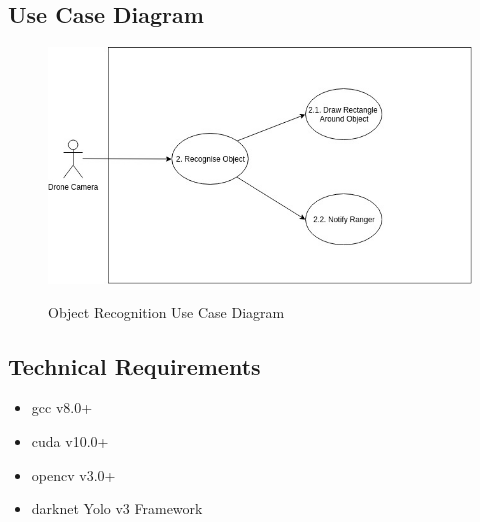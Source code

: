 \subsection{Use Case Diagram}
\begin{flushleft}
	\begin{figure}[h!]
		\centering
		\includegraphics[scale=0.5]{./assets/images/object-recognition-ucd.jpg}
		\label{fig: object-recognition-ucd }
		\caption{Object Recognition Use Case Diagram}
	\end{figure}

\end{flushleft}

\subsection{Technical Requirements}
	\begin{flushleft}
		\begin{itemize}
				\item gcc v8.0+
				\item cuda v10.0+
				\item opencv v3.0+
				\item darknet Yolo v3 Framework
		\end{itemize}
	\end{flushleft}
